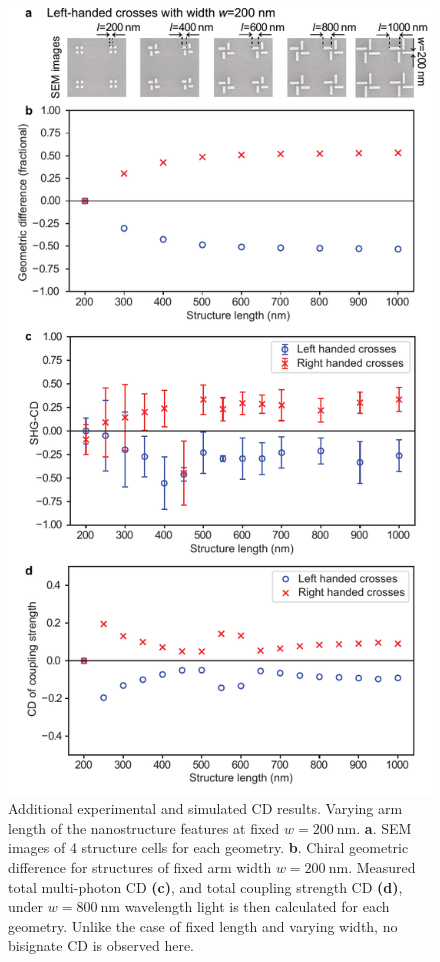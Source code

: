 \begin{figure}[htb!]	
    \centering	
    \includegraphics[scale=0.8]{./figures/results/EnantiomorphingChiralCrosses/d200.pdf}
    \caption{\label{fig:results:EnantiomorphingChiralCrosses:d200}
    Additional experimental and simulated CD results. Varying arm length of the nanostructure features at fixed $w=\SI{200}{\nano\m}$. \textbf{a}. SEM images of 4 structure cells for each geometry. \textbf{b}. Chiral geometric difference for structures of fixed arm width $w=\SI{200}{\nano\m}$. Measured total multi-photon CD \textbf{(c)}, and total coupling strength CD \textbf{(d)}, under $w=\SI{800}{\nano\m}$ wavelength light is then calculated for each geometry. Unlike the case of fixed length and varying width, no bisignate CD is observed here.}	
\end{figure}

